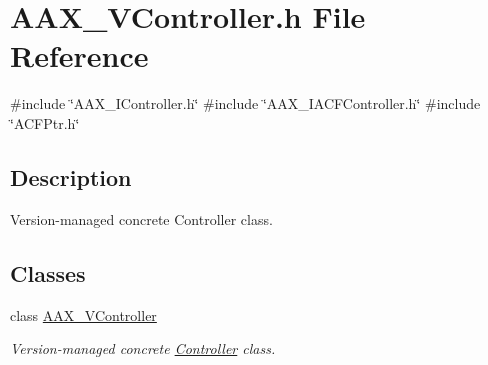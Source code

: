 \hypertarget{a00698}{}\section{A\+A\+X\+\_\+\+V\+Controller.\+h File Reference}
\label{a00698}
{\ttfamily \#include \char`\"{}A\+A\+X\+\_\+\+I\+Controller.\+h\char`\"{}}\newline
{\ttfamily \#include \char`\"{}A\+A\+X\+\_\+\+I\+A\+C\+F\+Controller.\+h\char`\"{}}\newline
{\ttfamily \#include \char`\"{}A\+C\+F\+Ptr.\+h\char`\"{}}\newline


\subsection{Description}
Version-\/managed concrete Controller class. 

\subsection*{Classes}
\begin{DoxyCompactItemize}
\item 
class \mbox{\hyperlink{a01905}{A\+A\+X\+\_\+\+V\+Controller}}
\begin{DoxyCompactList}\small\item\em Version-\/managed concrete \mbox{\hyperlink{a01789}{Controller}} class. \end{DoxyCompactList}\end{DoxyCompactItemize}
